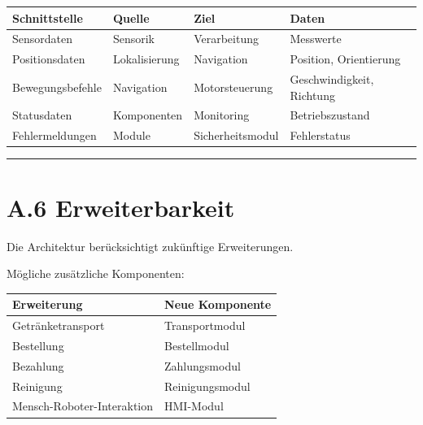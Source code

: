 \documentclass[
]{article}
\begin{document}
\begin{longtable}[]{@{}
  >{\raggedright\arraybackslash}p{}
  >{\raggedright\arraybackslash}p{}
  >{\raggedright\arraybackslash}p{}
  >{\raggedright\arraybackslash}p{}@{}}
\toprule\noalign{}
\begin{minipage}[b]{\linewidth}\raggedright
Schnittstelle
\end{minipage} & \begin{minipage}[b]{\linewidth}\raggedright
Quelle
\end{minipage} & \begin{minipage}[b]{\linewidth}\raggedright
Ziel
\end{minipage} & \begin{minipage}[b]{\linewidth}\raggedright
Daten
\end{minipage} \\
\midrule\noalign{}
\endhead
\bottomrule\noalign{}
\endlastfoot
Sensordaten & Sensorik & Verarbeitung & Messwerte \\
Positionsdaten & Lokalisierung & Navigation & Position, Orientierung \\
Bewegungsbefehle & Navigation & Motorsteuerung & Geschwindigkeit,
Richtung \\
Statusdaten & Komponenten & Monitoring & Betriebszustand \\
Fehlermeldungen & Module & Sicherheitsmodul & Fehlerstatus \\
\end{longtable}

\begin{center}\rule{0.5\linewidth}{0.5pt}\end{center}

\section{A.6 Erweiterbarkeit}\label{a.6-erweiterbarkeit}

Die Architektur berücksichtigt zukünftige Erweiterungen.

Mögliche zusätzliche Komponenten:

\begin{longtable}[]{@{}ll@{}}
\toprule\noalign{}
Erweiterung & Neue Komponente \\
\midrule\noalign{}
\endhead
\bottomrule\noalign{}
\endlastfoot
Getränketransport & Transportmodul \\
Bestellung & Bestellmodul \\
Bezahlung & Zahlungsmodul \\
Reinigung & Reinigungsmodul \\
Mensch-Roboter-Interaktion & HMI-Modul \\
\end{longtable}
\end{document}
